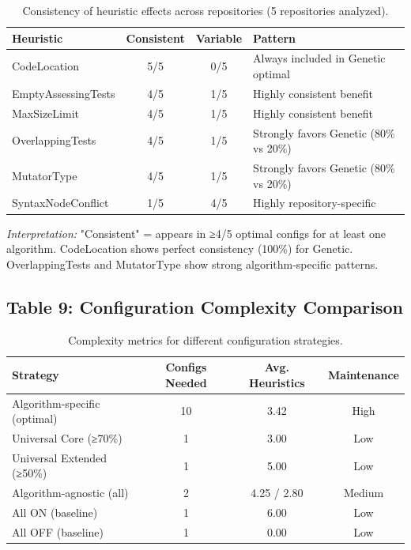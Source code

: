 \documentclass{article}
\begin{document}
\begin{table}[h]
\centering
\caption{Consistency of heuristic effects across repositories (5 repositories analyzed).}
\label{tab:consistency}
\begin{tabular}{@{}lccl@{}}
\toprule
\textbf{Heuristic} & \textbf{Consistent} & \textbf{Variable} & \textbf{Pattern} \\
\midrule
CodeLocation         & 5/5 & 0/5 & Always included in Genetic optimal \\
EmptyAssessingTests  & 4/5 & 1/5 & Highly consistent benefit \\
MaxSizeLimit         & 4/5 & 1/5 & Highly consistent benefit \\
OverlappingTests     & 4/5 & 1/5 & Strongly favors Genetic (80\% vs 20\%) \\
MutatorType          & 4/5 & 1/5 & Strongly favors Genetic (80\% vs 20\%) \\
SyntaxNodeConflict   & 1/5 & 4/5 & Highly repository-specific \\
\bottomrule
\end{tabular}
\end{table}

\textit{Interpretation:} "Consistent" = appears in ≥4/5 optimal configs for at least one algorithm. CodeLocation shows perfect consistency (100\%) for Genetic. OverlappingTests and MutatorType show strong algorithm-specific patterns.


\subsection*{Table 9: Configuration Complexity Comparison}

\begin{table}[h]
\centering
\caption{Complexity metrics for different configuration strategies.}
\label{tab:complexity}
\begin{tabular}{@{}lccc@{}}
\toprule
\textbf{Strategy} & \textbf{Configs Needed} & \textbf{Avg. Heuristics} & \textbf{Maintenance} \\
\midrule
Algorithm-specific (optimal) & 10 & 3.42 & High \\
Universal Core (≥70\%)       & 1  & 3.00 & Low \\
Universal Extended (≥50\%)   & 1  & 5.00 & Low \\
Algorithm-agnostic (all)     & 2  & 4.25 / 2.80 & Medium \\
All ON (baseline)            & 1  & 6.00 & Low \\
All OFF (baseline)           & 1  & 0.00 & Low \\
\bottomrule
\end{tabular}
\end{table}
\end{document}
